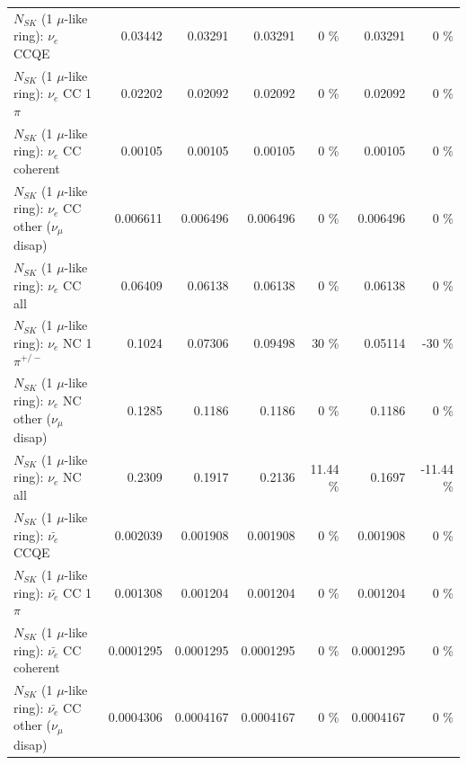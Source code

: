 \begin{table}
\begin{tabular}{| l | r | r | r  r | r  r |}
\hline
\hline
\hline
                                      $N_{SK}$ (1 $\mu$-like ring): $\nu_e$ CCQE &         0.03442 &         0.03291 &         0.03291 &        0 \%  &         0.03291 &        0 \%  \\ 
                                 $N_{SK}$ (1 $\mu$-like ring): $\nu_e$ CC 1$\pi$ &         0.02202 &         0.02092 &         0.02092 &        0 \%  &         0.02092 &        0 \%  \\ 
                               $N_{SK}$ (1 $\mu$-like ring): $\nu_e$ CC coherent &         0.00105 &         0.00105 &         0.00105 &        0 \%  &         0.00105 &        0 \%  \\ 
                $N_{SK}$ (1 $\mu$-like ring): $\nu_e$ CC other ($\nu_\mu$ disap) &        0.006611 &        0.006496 &        0.006496 &        0 \%  &        0.006496 &        0 \%  \\ 
                                  $N_{SK}$ (1 $\mu$-like ring): $\nu_{e}$ CC all &         0.06409 &         0.06138 &         0.06138 &        0 \%  &         0.06138 &        0 \%  \\ 
\hline
                           $N_{SK}$ (1 $\mu$-like ring): $\nu_e$ NC 1$\pi^{+/-}$ &          0.1024 &         0.07306 &         0.09498 &       30 \%  &         0.05114 &      -30 \%  \\ 
                $N_{SK}$ (1 $\mu$-like ring): $\nu_e$ NC other ($\nu_\mu$ disap) &          0.1285 &          0.1186 &          0.1186 &        0 \%  &          0.1186 &        0 \%  \\ 
                                  $N_{SK}$ (1 $\mu$-like ring): $\nu_{e}$ NC all &          0.2309 &          0.1917 &          0.2136 &    11.44 \%  &          0.1697 &   -11.44 \%  \\ 
\hline
\hline
\hline
                                $N_{SK}$ (1 $\mu$-like ring): $\bar{\nu_e}$ CCQE &        0.002039 &        0.001908 &        0.001908 &        0 \%  &        0.001908 &        0 \%  \\ 
                           $N_{SK}$ (1 $\mu$-like ring): $\bar{\nu_e}$ CC 1$\pi$ &        0.001308 &        0.001204 &        0.001204 &        0 \%  &        0.001204 &        0 \%  \\ 
                         $N_{SK}$ (1 $\mu$-like ring): $\bar{\nu_e}$ CC coherent &       0.0001295 &       0.0001295 &       0.0001295 &        0 \%  &       0.0001295 &        0 \%  \\ 
          $N_{SK}$ (1 $\mu$-like ring): $\bar{\nu_e}$ CC other ($\nu_\mu$ disap) &       0.0004306 &       0.0004167 &       0.0004167 &        0 \%  &       0.0004167 &        0 \%  \\ 

\end{tabular}
\end{table}
